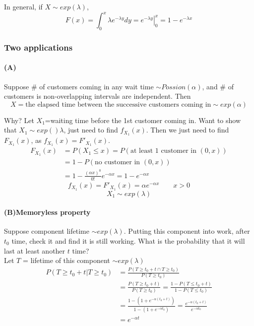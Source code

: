 In general, if $X\sim exp(\lambda)$,
\[F(x)=\int_0^{x} \lambda e^{-\lambda y} dy=\left. e^{-\lambda y}\right|_{0}^{x}=1-e^{-\lambda x}\]

\subsubsection{Two applications}
\paragraph{(A)}

Suppose \# of customers coming in any wait time $\sim Possion(\alpha)$, and \# of customers is non-overlapping intervals are independent. Then
\[X= \text{the elapsed time between the successive customers coming in}\sim exp(\alpha)\]

Why? Let $X_1$=waiting time before the 1st customer coming in. Want to show that $X_1 \sim exp()\lambda$, just need to find $f_{X_1}(x)$. Then we just need to find $F_{X_1}(x)$, as $f_{X_1}(x)=F'_{X_1}(x)$.
\begin{align*}
F_{X_1}(x)&= P(X_1\leq x)=P(\text{at least 1 customer in }(0,x)) \\
&= 1-P(\text{no customer in }(0,x)) \\
&=1-\frac{(\alpha x)^0}{0!}e^{-\alpha x}=1-e^{-\alpha x}
\end{align*}
\[f_{X_1}(x)=F'_{X_1}(x)=\alpha e^{-\alpha x} \qquad x>0\]
\[X_1 \sim exp(\lambda)\]


\paragraph{(B)Memoryless property}

Suppose component lifetime $\sim exp(\lambda)$. Putting this component into work, after $t_0$ time, check it and find it is still working. What is the probability that it will last at least another $t$ time?\\
Let $T$ = lifetime of this component $\sim exp(\lambda)$
\begin{align*}
P(T\geq t_0+t|T \geq t_0)&=\frac{P(T\geq t_0+t \cap T \geq t_0)}{P(T \geq t_0)} \\
&=\frac{P(T\geq t_0+t)}{P(T \geq t_0)}=\frac{1-P(T\leq t_0+t)}{1-P(T \leq t_0)} \\
&=\frac{1-(1+e^{-\alpha(t_0+t)})}{1-(1+e^{-\alpha t_0})}=\frac{e^{-\alpha(t_0+t)}}{e^{-\alpha t_0}} \\
&=e^{-\alpha t}
\end{align*}

